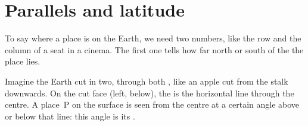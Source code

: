 \section{Parallels and latitude}

To say where a place is on the Earth, we need two numbers, like the row
and the column of a seat in a cinema. The first one tells how far north or
south of the  the place lies.

Imagine the Earth cut in two, through both , like an apple cut from
the stalk downwards. On the cut face (left, below), the  is the
horizontal line through the centre. A place~P on the surface is seen from
the centre at a certain angle above or below that line: this angle is its
.

